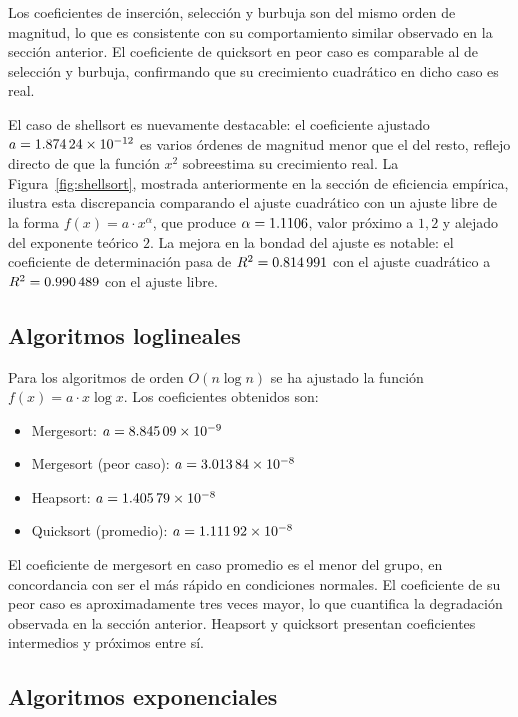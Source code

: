 \documentclass[12pt]{article}
\begin{document}
Los coeficientes de inserción, selección y burbuja son del mismo orden de
magnitud, lo que es consistente con su comportamiento similar observado en
la sección anterior. El coeficiente de quicksort en peor caso es comparable
al de selección y burbuja, confirmando que su crecimiento cuadrático en dicho
caso es real.

El caso de shellsort es nuevamente destacable: el coeficiente ajustado
$a = \num{1.87424e-12}$ es varios órdenes de magnitud menor que el del resto,
reflejo directo de que la función $x^2$ sobreestima su
crecimiento real. La Figura~\ref{fig:shellsort}, mostrada anteriormente
en la sección de eficiencia empírica, ilustra esta discrepancia comparando el ajuste cuadrático con
un ajuste libre de la forma $f(x) = a \cdot x^\alpha$, que produce $\alpha = \num{1.1106}$, valor
próximo a $1{,}2$ y alejado del exponente teórico $2$. La mejora en la
bondad del ajuste es notable: el coeficiente de determinación pasa de
$R^2 = \num{0.814991}$ con el ajuste cuadrático a
$R^2 = \num{0.990489}$ con el ajuste libre.

\subsection{Algoritmos loglineales}

Para los algoritmos de orden $O(n \log n)$ se ha ajustado la función
$f(x) = a \cdot x \log x$. Los coeficientes obtenidos son:

\begin{itemize}
    \item Mergesort: $a = \num{8.84509e-09}$
    \item Mergesort (peor caso): $a = \num{3.01384e-08}$
    \item Heapsort: $a = \num{1.40579e-08}$
    \item Quicksort (promedio): $a = \num{1.11192e-08}$
\end{itemize}

El coeficiente de mergesort en caso promedio es el menor del grupo, en
concordancia con ser el más rápido en condiciones normales. El coeficiente
de su peor caso es aproximadamente tres veces mayor, lo que cuantifica
la degradación observada en la sección anterior. Heapsort y quicksort
presentan coeficientes intermedios y próximos entre sí.

\subsection{Algoritmos exponenciales}
\end{document}
